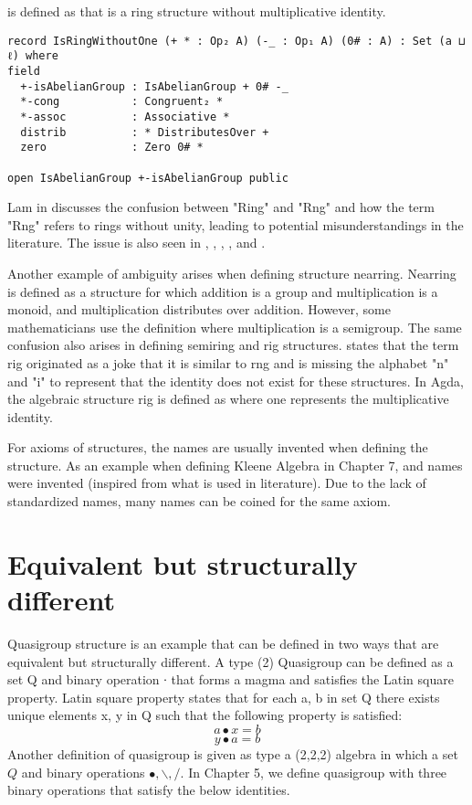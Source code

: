  is defined as  that is a ring structure without
multiplicative identity.

\begin{verbatim}
record IsRingWithoutOne (+ * : Op₂ A) (-_ : Op₁ A) (0# : A) : Set (a ⊔ ℓ) where
field
  +-isAbelianGroup : IsAbelianGroup + 0# -_
  *-cong           : Congruent₂ *
  *-assoc          : Associative *
  distrib          : * DistributesOver +
  zero             : Zero 0# *

open IsAbelianGroup +-isAbelianGroup public
\end{verbatim}

Lam in \cite{lam1991first} discusses the confusion between "Ring" and "Rng" and
how the term "Rng" refers to rings without unity, leading to potential
misunderstandings in the literature. The issue is also seen in
\cite{bosma1997magma}, \cite{jacobson1956structure},
\cite{persson1999application}, \cite{lehmann1977algebraic}, and
\cite{geuvers2002constructive}.

Another example of ambiguity arises when defining structure nearring. Nearring
is defined as a structure for which addition is a group and multiplication is a
monoid, and multiplication distributes over addition. However, some
mathematicians use the definition where multiplication is a semigroup. The same
confusion also arises in defining semiring and rig structures.
\cite{rasuli2022anti} states that the term rig originated as a joke that it is
similar to rng and is missing the alphabet "n" and "i" to represent that the
identity does not exist for these structures. In Agda, the algebraic structure
rig is defined as  where one represents the
multiplicative identity.

For axioms of structures, the names are usually invented when defining the
structure. As an example when defining Kleene Algebra in Chapter 7,
 and  names were invented
(inspired from what is used in literature). Due to the lack of standardized
names, many names can be coined for the same axiom. 

\section{Equivalent but structurally different}
Quasigroup structure is an example that can be defined in two ways that are
equivalent but structurally different. A type (2) Quasigroup can be defined as a
set Q and binary operation ∙ that forms a magma and satisfies the Latin square
property. Latin square property states that for each a, b in set Q there exists
unique elements x, y in Q such that the following property is satisfied:
\begin{equation}
a ∙ x = b
\end{equation}
\begin{equation}
y ∙ a = b
\end{equation}
Another definition of quasigroup is given as type a (2,2,2) algebra in which a
set $Q$ and binary operations $∙, \backslash, /$. In Chapter 5, we define
quasigroup with three binary operations that satisfy the below identities.

